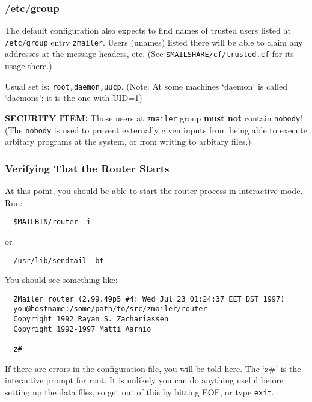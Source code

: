 \subsubsection{/etc/group}%
%

The default configuration also expects to find names of trusted users
listed at  {\tt /etc/group} entry {\tt zmailer}.  Users (unames) listed there
will be able to claim any addresses at the message headers, etc.
(See {\tt \$MAILSHARE/cf/trusted.cf} for its usage there.)

Usual set is: {\tt root,daemon,uucp}.
(Note: At some machines `daemon' is called `daemons'; it is
the one with UID=1)

{\bf SECURITY ITEM:} Those users at {\tt zmailer} group {\bf must not} contain {\tt nobody}!
(The {\tt nobody} is used to prevent externally given inputs from being
able to execute arbitary programs at the system, or from writing to
arbitary files.)




\subsubsection{Verifying That the Router Starts}%
%

At this point, you should be able to start the router process in
interactive mode.  Run:
\begin{verbatim}
  $MAILBIN/router -i
\end{verbatim}
or
\begin{verbatim}
  /usr/lib/sendmail -bt
\end{verbatim}

You should see something like:
\begin{verbatim}
  ZMailer router (2.99.49p5 #4: Wed Jul 23 01:24:37 EET DST 1997)
  you@hostname:/some/path/to/src/zmailer/router
  Copyright 1992 Rayan S. Zachariassen
  Copyright 1992-1997 Matti Aarnio
  
  z#    
\end{verbatim}

If there are errors in the configuration file, you will be told here.
The `z\#' is the interactive prompt for root. It is unlikely you can do anything useful 
before setting up the data files, so get out of this by hitting EOF, or type {\tt exit}.




